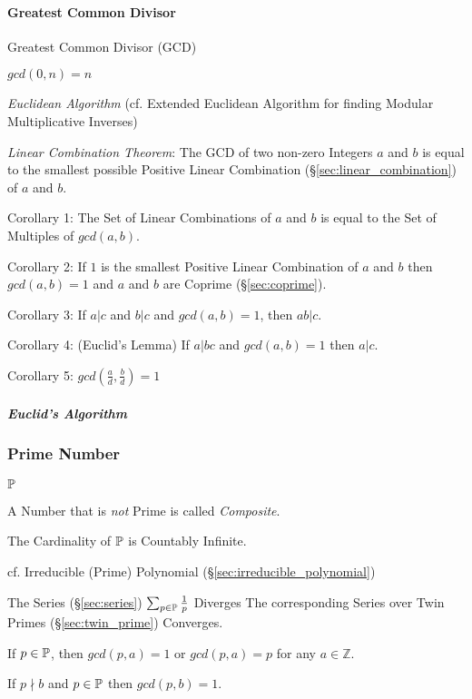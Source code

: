 \paragraph{Greatest Common Divisor}\label{sec:gcd}\hfill

Greatest Common Divisor (GCD)

$gcd(0,n) = n$

\emph{Euclidean Algorithm} (cf. Extended Euclidean Algorithm for finding Modular
Multiplicative Inverses)

\emph{Linear Combination Theorem}: The GCD of two non-zero Integers
$a$ and $b$ is equal to the smallest possible Positive Linear
Combination (\S\ref{sec:linear_combination}) of $a$ and $b$.

Corollary 1: The Set of Linear Combinations of $a$ and $b$ is equal to
the Set of Multiples of $gcd(a,b)$.

Corollary 2: If $1$ is the smallest Positive Linear Combination of $a$
and $b$ then $gcd(a,b) = 1$ and $a$ and $b$ are Coprime
(\S\ref{sec:coprime}).

Corollary 3: If $a|c$ and $b|c$ and $gcd(a,b) = 1$, then $ab|c$.

Corollary 4: (Euclid's Lemma) If $a | bc$ and $gcd(a,b) = 1$ then
$a|c$.

Corollary 5: $gcd(\frac{a}{d}, \frac{b}{d}) = 1$



\subparagraph{Euclid's Algorithm}\label{sec:euclids_algorithm}\hfill



\subsubsection{Prime Number}\label{sec:prime_number}

$\mathbb{P}$

A Number that is \emph{not} Prime is called \emph{Composite}.

The Cardinality of $\mathbb{P}$ is Countably Infinite.

cf. Irreducible (Prime) Polynomial (\S\ref{sec:irreducible_polynomial})

The Series (\S\ref{sec:series}) $\sum_{p \in \mathbb{P}} \frac{1}{p}$ Diverges The
corresponding Series over Twin Primes (\S\ref{sec:twin_prime}) Converges.

If $p \in \mathbb{P}$, then $gcd(p,a) = 1$ or $gcd(p,a) = p$ for any
$a \in \mathbb{Z}$.

If $p \nmid b$ and $p \in \mathbb{P}$ then $gcd (p,b) = 1$.

